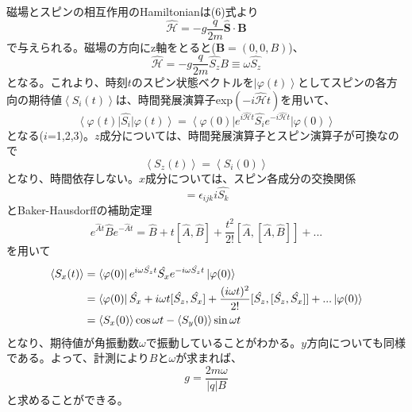 \documentclass{jsarticle}
\begin{document}
磁場とスピンの相互作用のHamiltonianは(6)式より
\begin{equation}
\mathcal{\hat{H}}=-g\frac{q}{2m}\bm{\hat{S}}\cdot\bm{B}
\end{equation}
で与えられる。磁場の方向にz軸をとると($\bm{B}=(0,0,B)$)、
\begin{equation}
\mathcal{\hat{H}}=-g\frac{q}{2m}\hat{S_z}{B}\equiv\omega\hat{S_z}
\end{equation}
となる。これより、時刻$t$のスピン状態ベクトルを$\left|\varphi(t)\right\rangle$としてスピンの各方向の期待値$\left\langle S_i(t)\right\rangle$は、時間発展演算子exp$(-i\mathcal{\hat{H}}t)$を用いて、
\begin{equation}
\left\langle\varphi(t)\right|\hat{S_i}\left|\varphi(t)\right\rangle=\left\langle\varphi(0)\right|e^{i\mathcal{\hat{H}}t}\hat{S_i}e^{-i\mathcal{\hat{H}}t}\left|\varphi(0)\right\rangle
\end{equation}
となる($i$=1,2,3)。$z$成分については、時間発展演算子とスピン演算子が可換なので
\begin{equation}
\left\langle S_z(t)\right\rangle=\left\langle S_i(0)\right\rangle
\end{equation}
となり、時間依存しない。$x$成分については、スピン各成分の交換関係
\begin{equation}
[\hat{S_i},\hat{S_j}]=\epsilon_{ijk}i\hat{S_k}
\end{equation}
とBaker-Hausdorffの補助定理
\begin{equation}
e^{\hat{A}t}\hat{B}e^{-\hat{A}t}=\hat{B}+t[\hat{A},\hat{B}]+\frac{t^2}{2!}[\hat{A},[\hat{A},\hat{B}]]+...
\end{equation}
を用いて
\begin{align}
\left\langle S_x(t)\right\rangle &=\left\langle\varphi(0)\right|e^{i\omega\hat{S_z}t}\hat{S_x}e^{-i\omega\hat{S_z}t}\left|\varphi(0)\right\rangle\notag\\&=\left\langle\varphi(0)\right|\hat{S_x}+i\omega t[\hat{S_z},\hat{S_x}]+\frac{(i\omega t)^2}{2!}[\hat{S_z},[\hat{S_z},\hat{S_x}]]+...\left|\varphi(0)\right\rangle\notag\\&=\left\langle S_x(0)\right\rangle\cos\omega t-\left\langle S_y(0)\right\rangle\sin\omega t
\end{align}
となり、期待値が角振動数$\omega$で振動していることがわかる。$y$方向についても同様である。よって、計測により$B$と$\omega$が求まれば、
\begin{equation}
g=\frac{2m\omega}{|q|B}
\end{equation}
と求めることができる。
\end{document}
